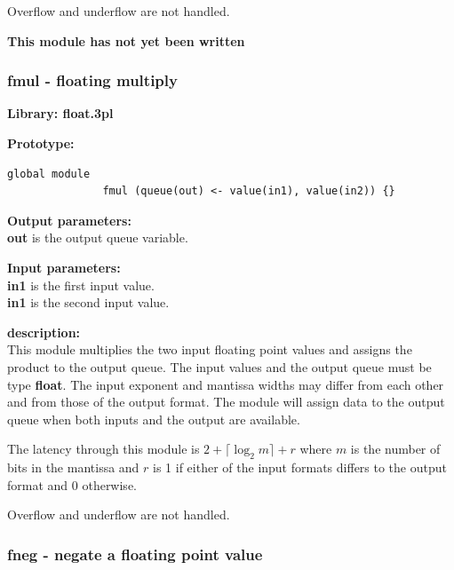             Overflow and underflow are not handled.
            
            {\bf {\large This module has not yet been written}}


        \subsubsection{fmul - floating multiply}\label{sec:lmfmul}

            {\bf Library: float.3pl}

            {\bf Prototype:} \\
            \vsp
            \begin{lstlisting}[gobble=12, language=threepl]
               global module
               fmul (queue(out) <- value(in1), value(in2)) {}
            \end{lstlisting}

            {\bf Output parameters:} \\
            {\bf out} is the output queue variable.

            {\bf Input parameters:} \\
            {\bf in1} is the first input value. \\
            {\bf in1} is the second input value.

            {\bf description:} \\
            This module multiplies the two input floating point values and
            assigns the product to the output queue. The input values and the
            output queue must be type {\bf float}. The input exponent and
            mantissa widths may differ from each other and from those of the
            output format. The module will assign data to the output queue when
            both inputs and the output are available.
            
            The latency through this module is $2 + \lceil \log_2 m \rceil + r$
            where $m$ is the number of bits in the mantissa and $r$ is 1 if
            either of the input formats differs to the output format and 0
            otherwise.
            
            Overflow and underflow are not handled.


        \subsubsection{fneg - negate a floating point value}\label{sec:lmfneg}


